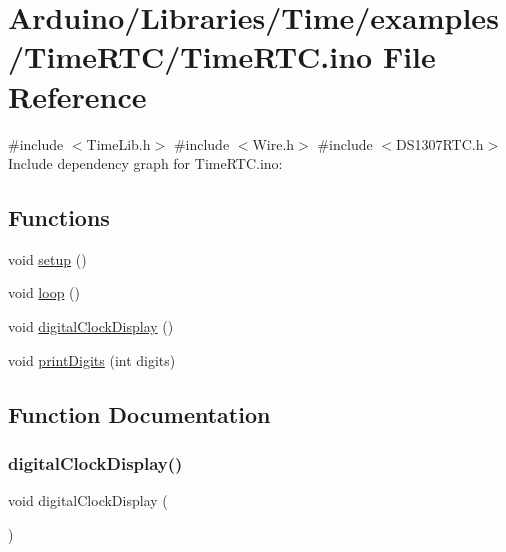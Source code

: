 \hypertarget{_time_r_t_c_8ino}{}\section{Arduino/\+Libraries/\+Time/examples/\+Time\+R\+T\+C/\+Time\+R\+TC.ino File Reference}
\label{_time_r_t_c_8ino}
{\ttfamily \#include $<$Time\+Lib.\+h$>$}\newline
{\ttfamily \#include $<$Wire.\+h$>$}\newline
{\ttfamily \#include $<$D\+S1307\+R\+T\+C.\+h$>$}\newline
Include dependency graph for Time\+R\+T\+C.\+ino\+:
\subsection*{Functions}
\begin{DoxyCompactItemize}
\item 
void \hyperlink{_time_r_t_c_8ino_a4fc01d736fe50cf5b977f755b675f11d}{setup} ()
\item 
void \hyperlink{_time_r_t_c_8ino_afe461d27b9c48d5921c00d521181f12f}{loop} ()
\item 
void \hyperlink{_time_r_t_c_8ino_a01f3a72442d58926459c48afce4746e7}{digital\+Clock\+Display} ()
\item 
void \hyperlink{_time_r_t_c_8ino_a772afab0396032477ec7b01d14c774b2}{print\+Digits} (int digits)
\end{DoxyCompactItemize}


\subsection{Function Documentation}
\mbox{\label{_time_r_t_c_8ino_a01f3a72442d58926459c48afce4746e7}} 
\subsubsection{\texorpdfstring{digital\+Clock\+Display()}{digitalClockDisplay()}}
{\footnotesize\ttfamily void digital\+Clock\+Display (\begin{DoxyParamCaption}{ }\end{DoxyParamCaption})}

